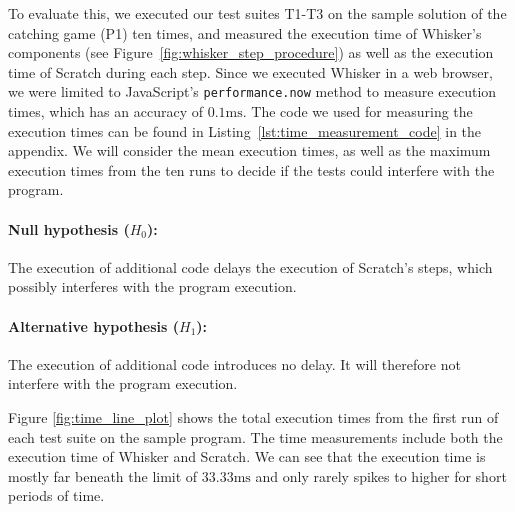 To evaluate this,
we executed our test suites T1-T3 on the sample solution of the catching game (P1) ten times,
and measured the execution time of Whisker's components (see Figure~\ref{fig:whisker_step_procedure})
as well as the execution time of Scratch during each step.
Since we executed Whisker in a web browser,
we were limited to JavaScript's \texttt{performance.now} method to measure execution times,
which has an accuracy of $0.1\text{ms}$.
The code we used for measuring the execution times can be found in Listing~\ref{lst:time_measurement_code} in the appendix.
We will consider the mean execution times, as well as the maximum execution times from the ten runs
to decide if the tests could interfere with the program.

\clearpage

\paragraph{Null hypothesis ($H_0$):}
The execution of additional code delays the execution of Scratch's steps, which possibly interferes with the program execution.
\vspace{-\medskipamount}
\paragraph{Alternative hypothesis ($H_1$):}
The execution of additional code introduces no delay. It will therefore not interfere with the program execution.
\parspace

\noindent Figure \ref{fig:time_line_plot} shows the total execution times
from the first run of each test suite on the sample program.
The time measurements include both the execution time of Whisker and Scratch.
We can see that the execution time is mostly far beneath the limit of $33.33\text{ms}$
and only rarely spikes to higher for short periods of time.
\parspace

